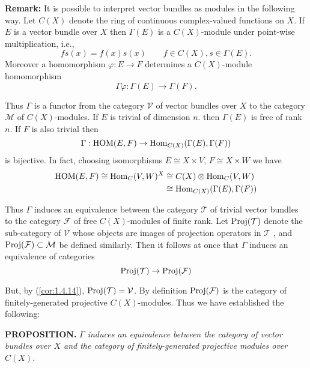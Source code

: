 \textbf{Remark:} It is possible to interpret vector bundles as modules in the following way. Let $C(X)$ denote the ring of continuous complex-valued functions on $X$. If $E$ is a vector bundle over $X$ then $\Gamma(E)$ is a $C(X)$-module under point-wise multiplication, i.e.,
\begin{equation*}
    fs(x) = f(x)s(x) \qquad f \in C(X), s \in \Gamma(E).
\end{equation*}
Moreover a homomorphism $\varphi: E \to F$ determines a $C(X)$-module homomorphism
\begin{equation*}
    \Gamma\varphi: \Gamma(E) \to \Gamma(F).
\end{equation*}

Thus $\Gamma$ is a functor from the category $\mathcal{V}$ of vector bundles over $X$ to the category $\mathcal{M}$ of $C(X)$-modules. If $E$ is trivial of dimension $n$. then $\Gamma(E)$ is free of rank $n$. If $F$ is also trivial then
\begin{equation*}
    \Gamma: \operatorname{HOM}(E, F) \to \operatorname{Hom}_{C(X)}(\Gamma(E), \Gamma(F))
\end{equation*}
is bijective. In fact, choosing isomorphisms $E \cong X \times V$, $F \cong X \times W$ we have
\begin{align*}
    \operatorname{HOM}(E, F) \cong \operatorname{Hom}_C(V, W)^X &\cong C(X) \otimes \operatorname{Hom}_C(V, W) \\
    &\cong \operatorname{Hom}_{C(X)}(\Gamma(E), \Gamma(F))
\end{align*}

Thus $\Gamma$ induces an equivalence between the category $\mathcal{T}$ of trivial vector bundles to the category $\mathcal{F}$ of free $C(X)$-modules of finite rank. Let $\operatorname{Proj}(\mathcal{T})$ denote the sub-category of $\mathcal{V}$ whose objects are images of projection operators in $\mathcal{T}$ , and $\operatorname{Proj}(\mathcal{F}) \subset \mathcal{M}$ be defined similarly. Then it follows at once that  $\Gamma$ induces an equivalence of categories
\begin{equation*}
    \operatorname{Proj}(\mathcal{T}) \to \operatorname{Proj}(\mathcal{F})
\end{equation*}

But, by (\ref{cor:1.4.14}), $\operatorname{Proj}(\mathcal{T}) = \mathcal{V}$. By definition $\operatorname{Proj}(\mathcal{F})$ is the category of finitely-generated projective $C(X)$-modules. Thus we have established the following: \par 

\textbf{PROPOSITION.} \textit{$\Gamma$ induces an equivalence between the category of vector bundles over $X$ and the category of finitely-generated projective modules over $C(X)$.} \newpage

